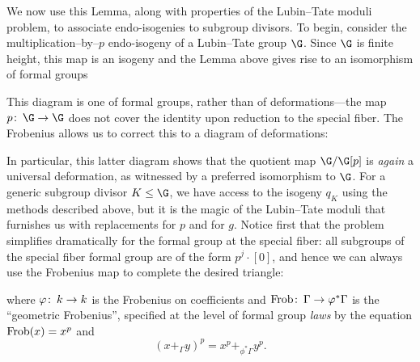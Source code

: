 We now use this Lemma, along with properties of the Lubin--Tate moduli problem, to associate endo-isogenies to subgroup divisors.  To begin, consider the multiplication--by--\(p\) endo-isogeny of a Lubin--Tate group \(\G\).  Since \(\G\) is finite height, this map is an isogeny and the Lemma above gives rise to an isomorphism of formal groups
\begin{center}
\end{center}
This diagram is one of formal groups, rather than of deformations---the map \(p\co \G \to \G\) does not cover the identity upon reduction to the special fiber.  The Frobenius allows us to correct this to a diagram of deformations:
\begin{center}
\end{center}
In particular, this latter diagram shows that the quotient map \(\G / \G[p]\) is \emph{again} a universal deformation, as witnessed by a preferred isomorphism to \(\G\).  For a generic subgroup divisor \(K \le \G\), we have access to the isogeny \(q_K\) using the methods described above, but it is the magic of the Lubin--Tate moduli that furnishes us with replacements for \(p\) and for \(g\).  Notice first that the problem simplifies dramatically for the formal group at the special fiber: all subgroups of the special fiber formal group are of the form \(p^j \cdot [0]\), and hence we can always use the Frobenius map to complete the desired triangle:
\begin{center}
\end{center}
where \(\varphi\colon\thinspace k \to k\) is the Frobenius on coefficients and \(\operatorname{Frob}\colon\thinspace \Gamma \to \varphi^* \Gamma\) is the ``geometric Frobenius'', specified at the level of formal group \emph{laws} by the equation \(\operatorname{Frob}(x) = x^p\) and \[(x +_\Gamma y)^p = x^p +_{\phi^* \Gamma} y^p.\]

